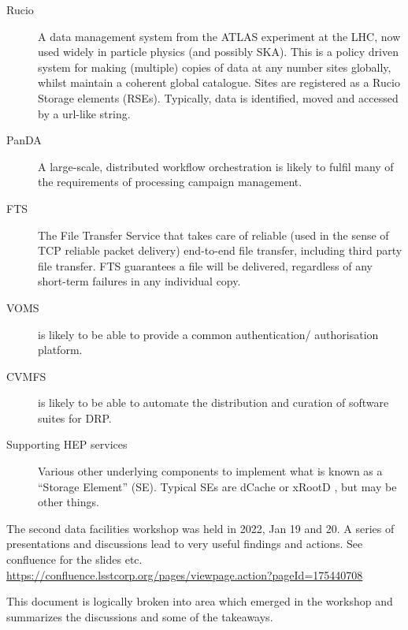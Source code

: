 \begin{description}

\item [Rucio] A data management system from the ATLAS experiment at the LHC, now used widely in particle physics (and possibly SKA). This is a policy driven system for making (multiple) copies of data at any number sites globally, whilst maintain a coherent global catalogue. Sites are registered as a Rucio Storage elements (RSEs).  Typically, data is identified, moved and accessed by a url-like string.

\item [PanDA] A large-scale, distributed workflow orchestration is likely to fulfil many of the requirements of processing campaign management.
  
\item [FTS]  The File Transfer Service that takes care of reliable (used in the sense of TCP reliable packet delivery) end-to-end file transfer, including third party file transfer. FTS guarantees a file will be delivered, regardless of any short-term failures in any individual copy.

\item [VOMS] is likely to be able to provide a common authentication/ authorisation platform.
        
\item [CVMFS] is likely to be able to automate the distribution and curation of software suites for DRP.
  
\item [Supporting HEP services] Various other underlying components to implement what is known as a “Storage Element” (SE). Typical SEs are dCache or xRootD , but may be other things.
 
\end{description}

The second data facilities workshop was held in 2022, Jan 19 and 20. A series of presentations and discussions lead to very useful findings and actions.  See confluence for the slides etc. \url{https://confluence.lsstcorp.org/pages/viewpage.action?pageId=175440708}

This document is logically broken into area which emerged in the workshop and summarizes the discussions and some of the takeaways.
